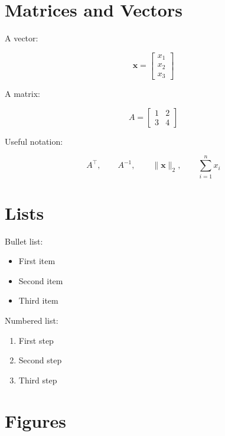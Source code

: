 \documentclass[11pt]{article}
\begin{document}
\section{Matrices and Vectors}

A vector:

\[
\mathbf{x}
=
\begin{bmatrix}
x_1 \\
x_2 \\
x_3
\end{bmatrix}
\]

A matrix:

\[
A
=
\begin{bmatrix}
1 & 2 \\
3 & 4
\end{bmatrix}
\]

Useful notation:

\[
A^\top,
\qquad
A^{-1},
\qquad
\|\mathbf{x}\|_2,
\qquad
\sum_{i=1}^{n} x_i
\]

\section{Lists}

Bullet list:

\begin{itemize}
    \item First item
    \item Second item
    \item Third item
\end{itemize}

Numbered list:

\begin{enumerate}
    \item First step
    \item Second step
    \item Third step
\end{enumerate}

\section{Figures}

\end{document}
